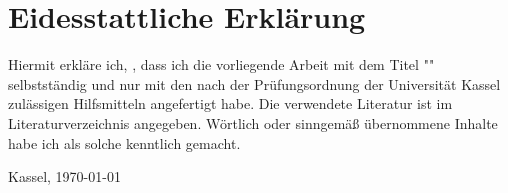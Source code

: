 \chapter*{Eidesstattliche Erklärung}


Hiermit erkläre ich, \thesisauthorname, dass ich die vorliegende Arbeit mit dem Titel "\thesistitle" selbstständig 
und nur mit den nach der Prüfungsordnung der Universität Kassel zulässigen Hilfsmitteln angefertigt habe.
Die verwendete Literatur ist im Literaturverzeichnis angegeben.
Wörtlich oder sinngemäß übernommene Inhalte habe ich als solche kenntlich gemacht.

\vspace{1cm}

Kassel, \today

\begin{flushright}
  \underline{\hspace{7cm}} \\
  \thesisauthorname
\end{flushright}
